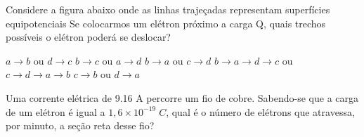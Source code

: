 \documentclass[12pt, addpoints]{exam}
\begin{document}
        \begin{questions}
\begin{multicols*}{2}
\question Considere a figura abaixo onde as linhas trajeçadas representam superfícies equipotenciais Se colocarmos um elétron próximo a carga Q, quais trechos possíveis o elétron poderá se deslocar?
        
        \begin{center}
            \begin{minipage}[c]{0.5\linewidth}
            \end{minipage}
        \end{center}
        
        

\begin{choices}
\choice $a\rightarrow b$ ou $d\rightarrow c$ 
\choice $b\rightarrow c$ ou $a\rightarrow d$ 
\choice $b\rightarrow a$ ou $c\rightarrow d$ 
\choice $b\rightarrow a\rightarrow d\rightarrow c$ ou $c\rightarrow d\rightarrow a\rightarrow b$ 
\choice $c\rightarrow b$ ou $d\rightarrow a$ 
\end{choices}
\question Uma corrente elétrica de    9.16 A percorre um ﬁo de cobre. Sabendo-se que a carga de um elétron é igual a $1,6\times 10^{-19}\;C$, qual é o número de elétrons que atravessa, por minuto, a seção reta desse ﬁo?


\end{multicols*}
\end{questions}
\end{document}

